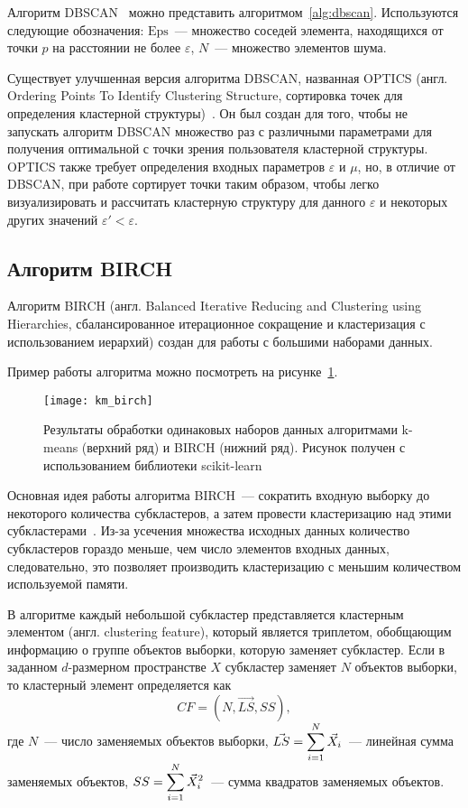 Алгоритм DBSCAN~\cite[с. 199]{dbscan-pos} можно представить алгоритмом~\ref{alg:dbscan}. Используются следующие обозначения: \( \mathrm{Eps} \)~--- множество соседей элемента, находящихся от точки \( p \) на расстоянии не более \( \varepsilon \), \( N \)~--- множество элементов шума.

Существует улучшенная версия алгоритма DBSCAN, названная OPTICS (англ. Ordering Points To Identify Clustering Structure, сортировка точек для определения кластерной структуры)~\cite{cod}. Он был создан для того, чтобы не запускать алгоритм DBSCAN множество раз с различными параметрами для получения оптимальной с точки зрения пользователя кластерной структуры. OPTICS также требует определения входных параметров \( \varepsilon \) и \( \mu \), но, в отличие от DBSCAN, при работе сортирует точки таким образом, чтобы легко визуализировать и рассчитать кластерную структуру для данного \( \varepsilon \) и некоторых других значений \( \varepsilon' < \varepsilon \).

\subsection{Алгоритм BIRCH}
Алгоритм BIRCH (англ. Balanced Iterative Reducing and Clustering using Hierarchies, сбалансированное итерационное сокращение и кластеризация с использованием иерархий) создан для работы с большими наборами данных.

Пример работы алгоритма можно посмотреть на рисунке~\ref{pic:km-birch}.

\begin{figure}[h!]
    \centering
    \texttt{[image: km\_birch]}\\[1ex]
    \parbox{.9\textwidth}{\caption{Результаты обработки одинаковых наборов данных алгоритмами k-means (верхний ряд) и BIRCH (нижний ряд). Рисунок получен с использованием библиотеки scikit-learn~\cite{sklearn}} \label{pic:km-birch}}
\end{figure}

Основная идея работы алгоритма BIRCH~--- сократить входную выборку до некоторого количества субкластеров, а затем провести кластеризацию над этими субкластерами~\cite{cod}. Из-за усечения множества исходных данных количество субкластеров гораздо меньше, чем число элементов входных данных, следовательно, это позволяет производить кластеризацию с меньшим количеством используемой памяти.

В алгоритме каждый небольшой субкластер представляется кластерным элементом (англ. clustering feature), который является триплетом, обобщающим информацию о группе объектов выборки, которую заменяет субкластер. Если в заданном \( d \)-размерном пространстве \( X \) субкластер заменяет \( N \) объектов выборки, то кластерный элемент определяется как
\[
    CF = \left(N, \vec{LS}, SS\right),
\]
где \( N \)~--- число заменяемых объектов выборки, \( \displaystyle\vec{LS} = \sum_{i=1}^N \vec{X}_i \)~--- линейная сумма заменяемых объектов, \( \displaystyle SS = \sum_{i=1}^N \vec{X}_i^2 \)~--- сумма квадратов заменяемых объектов.

